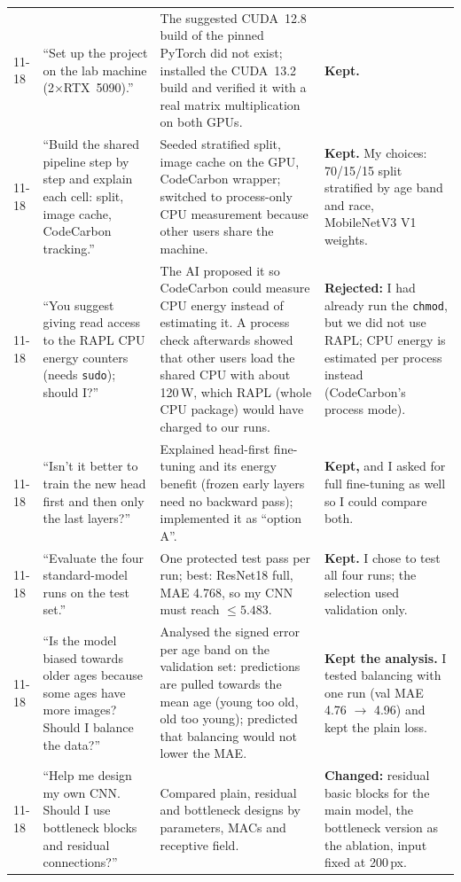 \documentclass[10pt,a4paper]{article}
\begin{document}
\begin{longtable}{@{}p{1.2cm}p{4.3cm}p{5.9cm}p{4.7cm}@{}}
11-18 & ``Set up the project on the lab machine (2$\times$RTX~5090).'' & The suggested CUDA~12.8 build of the pinned PyTorch did not exist; installed the CUDA~13.2 build and verified it with a real matrix multiplication on both GPUs. & \textbf{Kept.} \\
11-18 & ``Build the shared pipeline step by step and explain each cell: split, image cache, CodeCarbon tracking.'' & Seeded stratified split, image cache on the GPU, CodeCarbon wrapper; switched to process-only CPU measurement because other users share the machine. & \textbf{Kept.} My choices: 70/15/15 split stratified by age band and race, MobileNetV3 V1 weights. \\
11-18 & ``You suggest giving read access to the RAPL CPU energy counters (needs \texttt{sudo}); should I?'' & The AI proposed it so CodeCarbon could measure CPU energy instead of estimating it. A process check afterwards showed that other users load the shared CPU with about 120\,W, which RAPL (whole CPU package) would have charged to our runs. & \textbf{Rejected:} I had already run the \texttt{chmod}, but we did not use RAPL; CPU energy is estimated per process instead (CodeCarbon's process mode). \\
11-18 & ``Isn't it better to train the new head first and then only the last layers?'' & Explained head-first fine-tuning and its energy benefit (frozen early layers need no backward pass); implemented it as ``option A''. & \textbf{Kept,} and I asked for full fine-tuning as well so I could compare both. \\
11-18 & ``Evaluate the four standard-model runs on the test set.'' & One protected test pass per run; best: ResNet18 full, MAE 4.768, so my CNN must reach $\le5.483$. & \textbf{Kept.} I chose to test all four runs; the selection used validation only. \\
11-18 & ``Is the model biased towards older ages because some ages have more images? Should I balance the data?'' & Analysed the signed error per age band on the validation set: predictions are pulled towards the mean age (young too old, old too young); predicted that balancing would not lower the MAE. & \textbf{Kept the analysis.} I tested balancing with one run (val MAE 4.76 $\to$ 4.96) and kept the plain loss. \\
11-18 & ``Help me design my own CNN. Should I use bottleneck blocks and residual connections?'' & Compared plain, residual and bottleneck designs by parameters, MACs and receptive field. & \textbf{Changed:} residual basic blocks for the main model, the bottleneck version as the ablation, input fixed at 200\,px. \\

\end{longtable}
\end{document}
